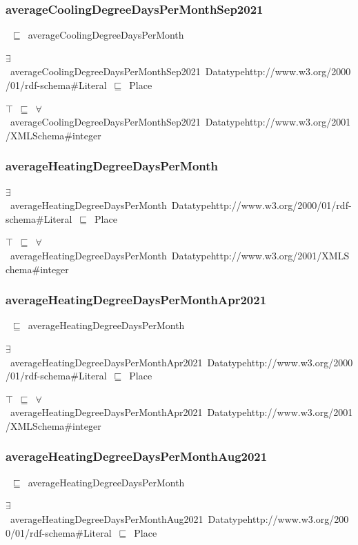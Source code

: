 \documentclass{article}
\begin{document}
\subsubsection*{averageCoolingDegreeDaysPerMonthSep2021}

~\ensuremath{\sqsubseteq}~averageCoolingDegreeDaysPerMonth

\ensuremath{\exists}~averageCoolingDegreeDaysPerMonthSep2021~Datatypehttp://www.w3.org/2000/01/rdf-schema#Literal~\ensuremath{\sqsubseteq}~Place

\ensuremath{\top}~\ensuremath{\sqsubseteq}~\ensuremath{\forall}~averageCoolingDegreeDaysPerMonthSep2021~Datatypehttp://www.w3.org/2001/XMLSchema#integer

\subsubsection*{averageHeatingDegreeDaysPerMonth}

\ensuremath{\exists}~averageHeatingDegreeDaysPerMonth~Datatypehttp://www.w3.org/2000/01/rdf-schema#Literal~\ensuremath{\sqsubseteq}~Place

\ensuremath{\top}~\ensuremath{\sqsubseteq}~\ensuremath{\forall}~averageHeatingDegreeDaysPerMonth~Datatypehttp://www.w3.org/2001/XMLSchema#integer

\subsubsection*{averageHeatingDegreeDaysPerMonthApr2021}

~\ensuremath{\sqsubseteq}~averageHeatingDegreeDaysPerMonth

\ensuremath{\exists}~averageHeatingDegreeDaysPerMonthApr2021~Datatypehttp://www.w3.org/2000/01/rdf-schema#Literal~\ensuremath{\sqsubseteq}~Place

\ensuremath{\top}~\ensuremath{\sqsubseteq}~\ensuremath{\forall}~averageHeatingDegreeDaysPerMonthApr2021~Datatypehttp://www.w3.org/2001/XMLSchema#integer

\subsubsection*{averageHeatingDegreeDaysPerMonthAug2021}

~\ensuremath{\sqsubseteq}~averageHeatingDegreeDaysPerMonth

\ensuremath{\exists}~averageHeatingDegreeDaysPerMonthAug2021~Datatypehttp://www.w3.org/2000/01/rdf-schema#Literal~\ensuremath{\sqsubseteq}~Place
\end{document}
